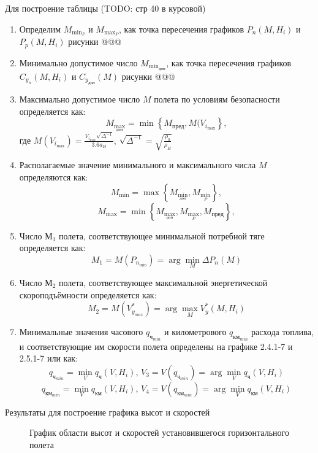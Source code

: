 Для построение таблицы (TODO: стр 40 в курсовой)
\begin{enumerate}
    \item Определим $M_{{\min}_P}$ и $M_{{\max}_P}$, как точка пересечения
        графиков $P_n(M, H_i)$ и $P_p(M, H_i)$ рисунки @@@ 
    \item Минимально допустимое число $M_{{\min}_{доп}}$, как точка пересечения
        графиков $C_{y_n}(M, H_i)$ и $C_{y_{доп}}(M)$ рисунки @@@
    \item Максимально допустимое число $M$ полета по условиям безопасности 
        определяется как: 
    \[
        M_{{\max}_{доп}} = \min \left\{ M_{пред}, M(V_{i_{\max}} \right\},
    \]
    где $M(V_{i_{\max}}) = \frac{V_{i_{\max}} \sqrt{\Delta^{-1}}}{3.6 a_H}$, 
    $\sqrt{\Delta^{-1}} = \sqrt{\frac{\rho_0}{\rho_H}}$
    \item Располагаемые значение минимального и максимального числа $M$
определяются как: 
\[
    M_{\min} = \max \left\{ M_{{\min}_{доп}}, M_{{\min}_P} \right\},
\]
\[
    M_{\max} = \min \left\{ M_{{\max}_{доп}}, M_{{\max}_P}, M_{пред} \right\},
\]
    \item Число $М_1$ полета, соответствующее минимальной потребной тяге
        определяется как:
        \[
            M_1 = M(P_{n_{\min}}) = \arg \min_{M} \Delta P_n (M)
        \]
    \item Число $М_2$ полета, соответствующее максимальной энергетической скороподъёмности
определяется как:
        \[
            M_2 = M(V_{y_{max}}^*) = \arg \max_{M} V_y^* (M, H_i)
        \]
    \item Минимальные значения часового $q_{ч_{min}}$ и километрового
        $q_{км_{min}}$ расхода топлива, и соответствующие им скорости полета
        определены на графике 2.4.1-7 и 2.5.1-7 или как:
        \[
            q_{ч_{min}} = \min_V q_ч(V, H_i), \, V_3 = V(q_{ч_{min}}) =
            \arg \min_V q_ч (V, H_i)
        \]
        \[
            q_{{км}_{min}} = \min_V q_{км}(V, H_i), \, V_4 = V(q_{{км}_{min}}) =
            \arg \min_V q_{км} (V, H_i)
        \]
\end{enumerate}
\begin{sidewaystable}
    \centering
    \caption{Результаты для построение графика высот и скоростей}
    \label{tab:H_M}
    
\end{sidewaystable}
\newpage

\begin{figure}[H]
\centering

\caption{График области высот и скоростей установившегося горизонтального полета}
\label{fig:H_M}
\end{figure}

